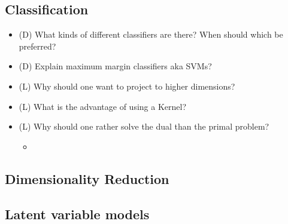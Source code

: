 \subsection*{Classification}

\begin{itemize}
    \item (D) What kinds of different classifiers are there? When should which be preferred?
    \item (D) Explain maximum margin classifiers aka SVMs?
    \item (L) Why should one want to project to higher dimensions?
    \item (L) What is the advantage of using a Kernel?
    \item (L) Why should one rather solve the dual than the primal problem?
    \begin{itemize}
        \item {}
    \end{itemize}
\end{itemize}

\subsection*{Dimensionality Reduction}

\subsection*{Latent variable models}